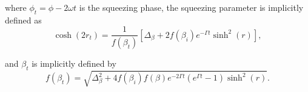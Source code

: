 \begin{apendicesenv}
\noindent where $\phi_t = \phi - 2\omega t$ is the squeezing phase, the squeezing parameter is implicitly defined as
\begin{equation}
    \cosh(2r_t) = \frac{1}{f(\beta_t)} [\Delta_\beta + 2f(\beta_i) e^{-\Gamma t} \sinh^2(r)],
\end{equation}

\noindent and $\beta_t$ is implicitly defined by
\begin{equation}
    f(\beta_t) = \sqrt{\Delta_\beta^2 + 4 f(\beta_i) f(\beta) e^{-2\Gamma t} (e^{\Gamma t} - 1) \sinh^2(r)}.
\end{equation}





\end{apendicesenv}
